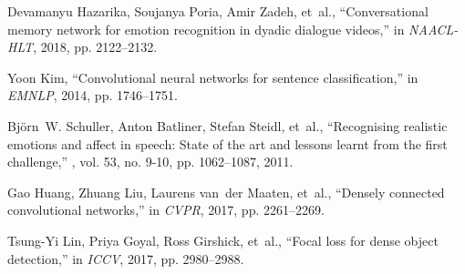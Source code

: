 \documentclass{article}
\begin{document}
\begin{thebibliography}{10}
  Devamanyu Hazarika, Soujanya Poria, Amir Zadeh, et~al.,
  \newblock ``Conversational memory network for emotion recognition in dyadic
    dialogue videos,''
  \newblock in {\em {NAACL-HLT}}, 2018, pp. 2122--2132.
  
  Yoon Kim,
  \newblock ``Convolutional neural networks for sentence classification,''
  \newblock in {\em {EMNLP}}, 2014, pp. 1746--1751.
  
  Bj{\"{o}}rn~W. Schuller, Anton Batliner, Stefan Steidl, et~al.,
  \newblock ``Recognising realistic emotions and affect in speech: State of the
    art and lessons learnt from the first challenge,''
  , vol. 53, no. 9-10, pp. 1062--1087, 2011.
  
  Gao Huang, Zhuang Liu, Laurens van~der Maaten, et~al.,
  \newblock ``Densely connected convolutional networks,''
  \newblock in {\em {CVPR}}, 2017, pp. 2261--2269.
  
  Tsung-Yi Lin, Priya Goyal, Ross Girshick, et~al.,
  \newblock ``Focal loss for dense object detection,''
  \newblock in {\em ICCV}, 2017, pp. 2980--2988.
  
  \end{thebibliography}
  
\end{document}
